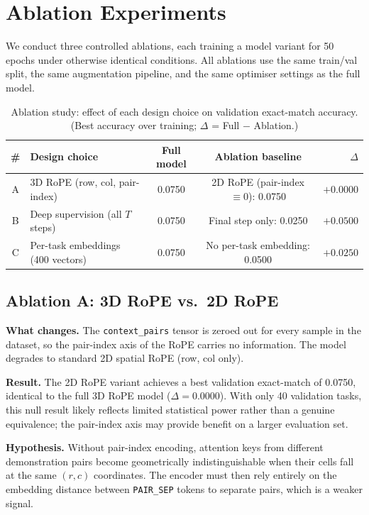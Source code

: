 \documentclass[11pt,a4paper]{article}
\begin{document}
\section{Ablation Experiments}
\label{sec:ablation}

We conduct three controlled ablations, each training a model variant for 50 epochs
under otherwise identical conditions.  All ablations use the same train/val split, the
same augmentation pipeline, and the same optimiser settings as the full model.

\begin{table}[H]
\centering
\caption{Ablation study: effect of each design choice on validation exact-match accuracy.
(Best accuracy over training; $\Delta$ = Full $-$ Ablation.)}
\label{tab:ablation}
\begin{tabular}{clccr}
\toprule
\# & Design choice & Full model & Ablation baseline & $\Delta$ \\
\midrule
A & 3D RoPE (row, col, pair-index)
  & 0.0750
  & 2D RoPE (pair-index $\equiv 0$): 0.0750
  & $+0.0000$ \\
B & Deep supervision (all $T$ steps)
  & 0.0750
  & Final step only: 0.0250
  & $\mathbf{+0.0500}$ \\
C & Per-task embeddings (400 vectors)
  & 0.0750
  & No per-task embedding: 0.0500
  & $+0.0250$ \\
\bottomrule
\end{tabular}
\end{table}

\subsection{Ablation A: 3D RoPE vs.\ 2D RoPE}

\textbf{What changes.}  The \texttt{context\_pairs} tensor is zeroed out for every
sample in the dataset, so the pair-index axis of the RoPE carries no information.
The model degrades to standard 2D spatial RoPE (row, col only).

\textbf{Result.}  The 2D RoPE variant achieves a best validation exact-match of
0.0750, identical to the full 3D RoPE model ($\Delta = 0.0000$).  With only 40
validation tasks, this null result likely reflects limited statistical power rather
than a genuine equivalence; the pair-index axis may provide benefit on a larger
evaluation set.

\textbf{Hypothesis.}  Without pair-index encoding, attention keys from different
demonstration pairs become geometrically indistinguishable when their cells fall at the
same $(r, c)$ coordinates.  The encoder must then rely entirely on the embedding
distance between \texttt{PAIR\_SEP} tokens to separate pairs, which is a weaker signal.
\end{document}

